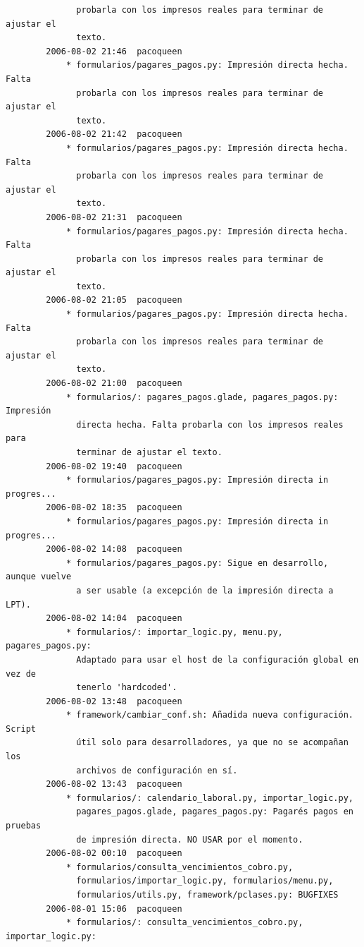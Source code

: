 \documentclass[a4paper]{article}
\begin{document}
\begin{verbatim}
              probarla con los impresos reales para terminar de ajustar el
              texto.
        2006-08-02 21:46  pacoqueen
            * formularios/pagares_pagos.py: Impresión directa hecha. Falta
              probarla con los impresos reales para terminar de ajustar el
              texto.
        2006-08-02 21:42  pacoqueen
            * formularios/pagares_pagos.py: Impresión directa hecha. Falta
              probarla con los impresos reales para terminar de ajustar el
              texto.
        2006-08-02 21:31  pacoqueen
            * formularios/pagares_pagos.py: Impresión directa hecha. Falta
              probarla con los impresos reales para terminar de ajustar el
              texto.
        2006-08-02 21:05  pacoqueen
            * formularios/pagares_pagos.py: Impresión directa hecha. Falta
              probarla con los impresos reales para terminar de ajustar el
              texto.
        2006-08-02 21:00  pacoqueen
            * formularios/: pagares_pagos.glade, pagares_pagos.py: Impresión
              directa hecha. Falta probarla con los impresos reales para
              terminar de ajustar el texto.
        2006-08-02 19:40  pacoqueen
            * formularios/pagares_pagos.py: Impresión directa in progres...
        2006-08-02 18:35  pacoqueen
            * formularios/pagares_pagos.py: Impresión directa in progres...
        2006-08-02 14:08  pacoqueen
            * formularios/pagares_pagos.py: Sigue en desarrollo, aunque vuelve
              a ser usable (a excepción de la impresión directa a LPT).
        2006-08-02 14:04  pacoqueen
            * formularios/: importar_logic.py, menu.py, pagares_pagos.py:
              Adaptado para usar el host de la configuración global en vez de
              tenerlo 'hardcoded'.
        2006-08-02 13:48  pacoqueen
            * framework/cambiar_conf.sh: Añadida nueva configuración. Script
              útil solo para desarrolladores, ya que no se acompañan los
              archivos de configuración en sí.
        2006-08-02 13:43  pacoqueen
            * formularios/: calendario_laboral.py, importar_logic.py,
              pagares_pagos.glade, pagares_pagos.py: Pagarés pagos en pruebas
              de impresión directa. NO USAR por el momento.
        2006-08-02 00:10  pacoqueen
            * formularios/consulta_vencimientos_cobro.py,
              formularios/importar_logic.py, formularios/menu.py,
              formularios/utils.py, framework/pclases.py: BUGFIXES
        2006-08-01 15:06  pacoqueen
            * formularios/: consulta_vencimientos_cobro.py, importar_logic.py:

\end{verbatim}
\end{document}
